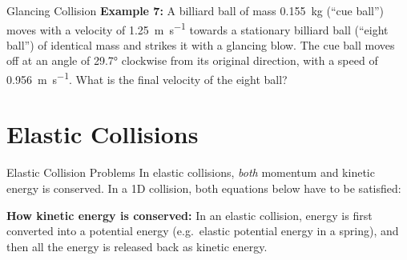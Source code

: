 \documentclass[12pt,compress,aspectratio=169]{beamer}
\begin{document}
\begin{frame}{Glancing Collision}
  \vspace{.3in}\textbf{Example 7:} A billiard ball of mass \SI{.155}{\kilo\gram}
  (``cue ball'') moves with a velocity of \SI{1.25}{\metre\per\second} towards
  a stationary billiard ball (``eight ball'') of identical mass and strikes it
  with a glancing blow. The cue ball moves off at an angle of \ang{29.7}
  clockwise from its original direction, with a speed of
  \SI{.956}{\metre\per\second}. What is the final velocity of the eight ball?
\end{frame}




\section{Elastic Collisions}

\begin{frame}{Elastic Collision Problems}
  In elastic collisions, \emph{both} momentum and kinetic energy is conserved.
  In a 1D collision, both equations below have to be satisfied:

  \vspace{-.2in}{\Large
    \begin{align*}
      \sum m_iv_i&=\sum m_iv_i'\\
      \sum\frac12 m_iv_i^2&=\sum\frac12 m_iv_i'^2
    \end{align*}
  }

  \textbf{How kinetic energy is conserved:} In an elastic collision, energy is
  first converted into a potential energy (e.g.\ elastic potential energy in a
  spring), and then all the energy is released back as kinetic energy.
\end{frame}
\end{document}
